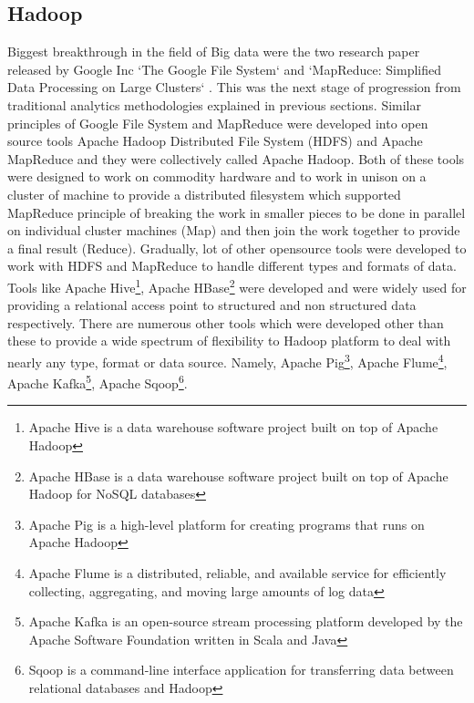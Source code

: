 \documentclass[sigconf]{acmart}
\begin{document}
\subsection{Hadoop}
Biggest breakthrough in the field of Big data were the two research paper released by Google Inc `The Google File System` \cite{ghemawatgoogle} and `MapReduce: Simplified Data Processing on Large Clusters` \cite{mapreducegoogle}. This was the next stage of progression from traditional analytics methodologies explained in previous sections. Similar principles of Google File System and MapReduce were developed into open source tools Apache Hadoop Distributed File System (HDFS) and Apache MapReduce and they were collectively called Apache Hadoop. Both of these tools were designed to work on commodity hardware and to work in unison on a cluster of machine to provide a distributed filesystem which supported MapReduce principle of breaking the work in smaller pieces to be done in parallel on individual cluster machines (Map) and then join the work together to provide a final result (Reduce). Gradually, lot of other opensource tools were developed to work with HDFS and MapReduce to handle different types and formats of data. Tools like Apache Hive\footnote{Apache Hive is a data warehouse software project built on top of Apache Hadoop}, Apache HBase\footnote{Apache HBase is a data warehouse software project built on top of Apache Hadoop for NoSQL databases} were developed and were widely used for providing a relational access point to structured and non structured data respectively. There are numerous other tools which were developed other than these to provide a wide spectrum of flexibility to Hadoop platform to deal with nearly any type, format or data source. Namely, Apache Pig\footnote{Apache Pig is a high-level platform for creating programs that runs on Apache Hadoop}, Apache Flume\footnote{Apache Flume is a distributed, reliable, and available service for efficiently collecting, aggregating, and moving large amounts of log data}, Apache Kafka\footnote{Apache Kafka is an open-source stream processing platform developed by the Apache Software Foundation written in Scala and Java}, Apache Sqoop\footnote{Sqoop is a command-line interface application for transferring data between relational databases and Hadoop}. 
\end{document}
